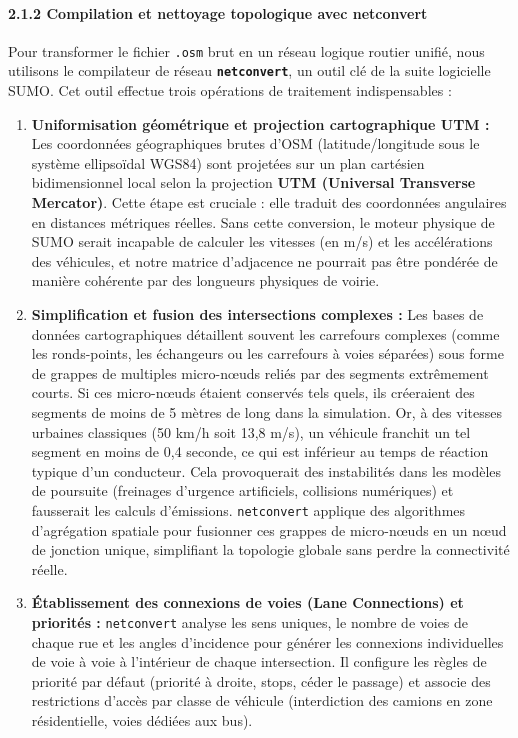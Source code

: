 \documentclass[10pt, a4paper]{article}
\begin{document}
\paragraph{2.1.2 Compilation et nettoyage topologique avec
netconvert}\label{compilation-et-nettoyage-topologique-avec-netconvert}

Pour transformer le fichier \texttt{.osm} brut en un réseau logique
routier unifié, nous utilisons le compilateur de réseau
\textbf{\texttt{netconvert}}, un outil clé de la suite logicielle SUMO.
Cet outil effectue trois opérations de traitement indispensables :

\begin{enumerate}
\def\labelenumi{\arabic{enumi}.}
\item
  \textbf{Uniformisation géométrique et projection cartographique UTM :}
  Les coordonnées géographiques brutes d'OSM (latitude/longitude sous le
  système ellipsoïdal WGS84) sont projetées sur un plan cartésien
  bidimensionnel local selon la projection \textbf{UTM (Universal
  Transverse Mercator)}. Cette étape est cruciale : elle traduit des
  coordonnées angulaires en distances métriques réelles. Sans cette
  conversion, le moteur physique de SUMO serait incapable de calculer
  les vitesses (en m/s) et les accélérations des véhicules, et notre
  matrice d'adjacence ne pourrait pas être pondérée de manière cohérente
  par des longueurs physiques de voirie.
\item
  \textbf{Simplification et fusion des intersections complexes :} Les
  bases de données cartographiques détaillent souvent les carrefours
  complexes (comme les ronds-points, les échangeurs ou les carrefours à
  voies séparées) sous forme de grappes de multiples micro-nœuds reliés
  par des segments extrêmement courts. Si ces micro-nœuds étaient
  conservés tels quels, ils créeraient des segments de moins de 5 mètres
  de long dans la simulation. Or, à des vitesses urbaines classiques (50
  km/h soit 13,8 m/s), un véhicule franchit un tel segment en moins de
  0,4 seconde, ce qui est inférieur au temps de réaction typique d'un
  conducteur. Cela provoquerait des instabilités dans les modèles de
  poursuite (freinages d'urgence artificiels, collisions numériques) et
  fausserait les calculs d'émissions. \texttt{netconvert} applique des
  algorithmes d'agrégation spatiale pour fusionner ces grappes de
  micro-nœuds en un nœud de jonction unique, simplifiant la topologie
  globale sans perdre la connectivité réelle.
\item
  \textbf{Établissement des connexions de voies (Lane Connections) et
  priorités :} \texttt{netconvert} analyse les sens uniques, le nombre
  de voies de chaque rue et les angles d'incidence pour générer les
  connexions individuelles de voie à voie à l'intérieur de chaque
  intersection. Il configure les règles de priorité par défaut (priorité
  à droite, stops, céder le passage) et associe des restrictions d'accès
  par classe de véhicule (interdiction des camions en zone
  résidentielle, voies dédiées aux bus).
\end{enumerate}
\end{document}
